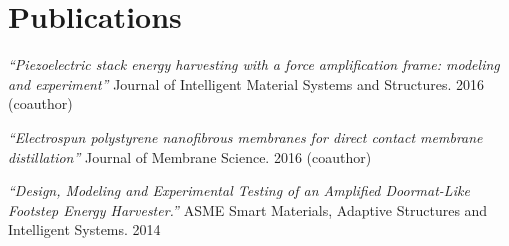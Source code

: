\documentclass[letterpaper]{deedy-resume} %
\begin{document}
\begin{minipage}[t]{0.66\textwidth}
\section{Publications}


\begin{tightitemize}
    \item \textit{“Piezoelectric stack energy harvesting with a force amplification frame: modeling and experiment”} Journal of Intelligent Material Systems and Structures. 2016 (coauthor)
    \item \textit{“Electrospun polystyrene nanofibrous membranes for direct contact membrane distillation”} Journal of Membrane Science. 2016 (coauthor)
    \item \textit{“Design, Modeling and Experimental Testing of an Amplified Doormat-Like Footstep Energy Harvester.”} ASME Smart Materials, Adaptive Structures and Intelligent Systems. 2014 
\end{tightitemize}
\sectionspace %








\end{minipage} %
\end{document}

